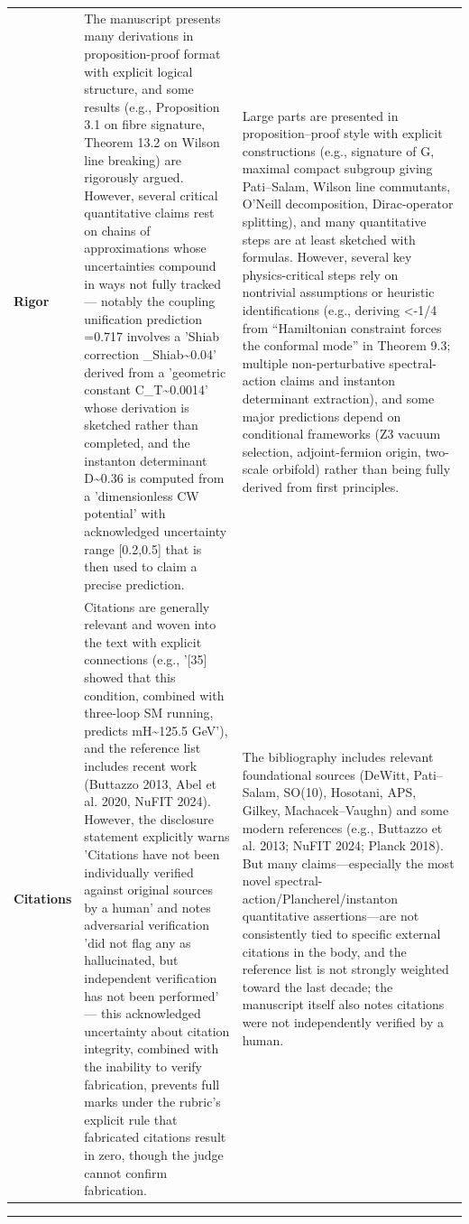 \documentclass[11pt]{article}
\begin{document}
\begin{longtable}{@{} p{2.2cm} p{6.3cm} p{6.3cm} @{}}
\rowcolor{rowgray}
\textbf{Rigor} &
The manuscript presents many derivations in proposition-proof format with explicit logical structure, and some results (e.g., Proposition 3.1 on fibre signature, Theorem 13.2 on Wilson line breaking) are rigorously argued. However, several critical quantitative claims rest on chains of approximations whose uncertainties compound in ways not fully tracked --- notably the coupling unification prediction \textrho{}=0.717 involves a 'Shiab correction \textdelta{}\textDelta{}\_Shiab\textasciitilde{}0.04' derived from a 'geometric constant C\_T\textasciitilde{}0.0014' whose derivation is sketched rather than completed, and the instanton determinant D\textasciitilde{}0.36 is computed from a 'dimensionless CW potential' with acknowledged uncertainty range [0.2,0.5] that is then used to claim a precise prediction. &
Large parts are presented in proposition--proof style with explicit constructions (e.g., signature of G\textlambda{}, maximal compact subgroup giving Pati--Salam, Wilson line commutants, O'Neill decomposition, Dirac-operator splitting), and many quantitative steps are at least sketched with formulas. However, several key physics-critical steps rely on nontrivial assumptions or heuristic identifications (e.g., deriving \textlambda{}<-1/4 from ``Hamiltonian constraint forces the conformal mode'' in Theorem 9.3; multiple non-perturbative spectral-action claims and instanton determinant extraction), and some major predictions depend on conditional frameworks (Z3 vacuum selection, adjoint-fermion origin, two-scale orbifold) rather than being fully derived from first principles. \\[6pt]

\textbf{Citations} &
Citations are generally relevant and woven into the text with explicit connections (e.g., '[35] showed that this condition, combined with three-loop SM running, predicts mH\textasciitilde{}125.5 GeV'), and the reference list includes recent work (Buttazzo 2013, Abel et al. 2020, NuFIT 2024). However, the disclosure statement explicitly warns 'Citations have not been individually verified against original sources by a human' and notes adversarial verification 'did not flag any as hallucinated, but independent verification has not been performed' --- this acknowledged uncertainty about citation integrity, combined with the inability to verify fabrication, prevents full marks under the rubric's explicit rule that fabricated citations result in zero, though the judge cannot confirm fabrication. &
The bibliography includes relevant foundational sources (DeWitt, Pati--Salam, SO(10), Hosotani, APS, Gilkey, Machacek--Vaughn) and some modern references (e.g., Buttazzo et al. 2013; NuFIT 2024; Planck 2018). But many claims---especially the most novel spectral-action/Plancherel/instanton quantitative assertions---are not consistently tied to specific external citations in the body, and the reference list is not strongly weighted toward the last decade; the manuscript itself also notes citations were not independently verified by a human. \\

\end{longtable}

\bigskip
\hrule
\bigskip
\end{document}

